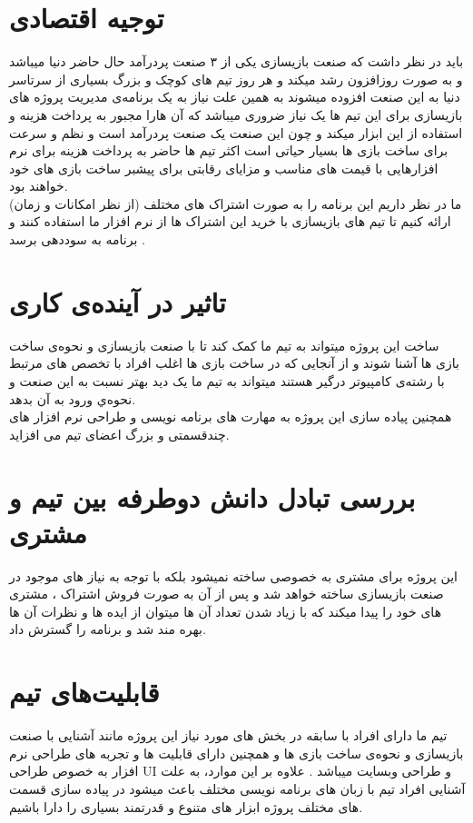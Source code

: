 \documentclass[10pt,a4paper]{article}
\begin{document}
\section{
توجیه اقتصادی
}
باید در نظر داشت که صنعت بازیسازی یکی از ۳ صنعت پردرآمد حال حاضر دنیا میباشد و به صورت روزافزون رشد میکند و هر روز تیم های کوچک و بزرگ بسیاری از سرتاسر دنیا به این صنعت افزوده میشوند به همین علت نیاز به یک برنامه‌ی مدیریت پروژه های بازیسازی برای این تیم ها یک نیاز ضروری میباشد که آن هارا مجبور به پرداخت هزینه و استفاده از این ابزار میکند و چون این صنعت یک صنعت پردرآمد است و نظم و سرعت برای ساخت بازی ها بسیار حیاتی است اکثر تیم ها حاضر به پرداخت هزینه برای نرم افزارهایی با قیمت های مناسب و مزایای رقابتی برای پیشبر ساخت بازی های خود خواهند بود.\\
ما در نظر داریم این برنامه را به صورت اشتراک های مختلف (از نظر امکانات و زمان) ارائه کنیم تا تیم های بازیسازی با خرید این اشتراک ها از نرم افزار ما استفاده کنند و برنامه به سوددهی برسد .

\section{
تاثیر در آینده‌ی کاری
}
ساخت این پروژه میتواند به تیم ما کمک کند تا با صنعت بازیسازی و نحوه‌ی ساخت بازی ها آشنا شوند و از آنجایی که در ساخت بازی ها اغلب افراد با تخصص های مرتبط با رشته‌ی کامپیوتر درگیر هستند میتواند به تیم ما یک دید بهتر نسبت به این 
صنعت و نحوه‌ي ورود به آن بدهد.
\\
همچنین پیاده سازی این پروژه به مهارت های برنامه نویسی و طراحی نرم افزار های چندقسمتی و بزرگ اعضای تیم می افزاید.

\section{
بررسی تبادل دانش دوطرفه بین تیم و مشتری
}
این پروژه برای مشتری به خصوصی  ساخته نمیشود بلکه با توجه به نیاز های موجود در صنعت بازیسازی ساخته خواهد شد و پس از آن به صورت فروش اشتراک ، مشتری های خود را پیدا میکند که با زیاد شدن تعداد آن ها میتوان از ایده ها و نظرات آن ها بهره مند شد و برنامه را گسترش داد.

\section{
قابلیت‌های تیم 
}
تیم ما دارای افراد با سابقه در بخش های مورد نیاز این پروژه مانند آشنایی با صنعت بازیسازی و نحوه‌ی ساخت بازی ها و همچنین دارای قابلیت ها و تجربه های طراحی نرم افزار به خصوص طراحی UI و طراحی وبسایت میباشد . علاوه بر این موارد، به علت آشنایی افراد تیم با زبان های برنامه نویسی مختلف باعث میشود در پیاده سازی قسمت های مختلف پروژه ابزار های متنوع و قدرتمند بسیاری را دارا باشیم.
	\newpage
\end{document}
